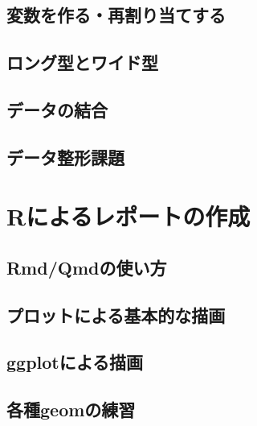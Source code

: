 \documentclass[
  a4paper,
]{ltjsbook}
\begin{document}
\section{変数を作る・再割り当てする}\label{ux5909ux6570ux3092ux4f5cux308bux518dux5272ux308aux5f53ux3066ux3059ux308b}

\section{ロング型とワイド型}\label{ux30edux30f3ux30b0ux578bux3068ux30efux30a4ux30c9ux578b}

\section{データの結合}\label{ux30c7ux30fcux30bfux306eux7d50ux5408}

\section{データ整形課題}\label{ux30c7ux30fcux30bfux6574ux5f62ux8ab2ux984c}


\chapter{Rによるレポートの作成}\label{rux306bux3088ux308bux30ecux30ddux30fcux30c8ux306eux4f5cux6210}

\section{Rmd/Qmdの使い方}\label{rmdqmdux306eux4f7fux3044ux65b9}

\section{プロットによる基本的な描画}\label{ux30d7ux30edux30c3ux30c8ux306bux3088ux308bux57faux672cux7684ux306aux63cfux753b}

\section{ggplotによる描画}\label{ggplotux306bux3088ux308bux63cfux753b}

\section{各種geomの練習}\label{ux5404ux7a2egeomux306eux7df4ux7fd2}
\end{document}
